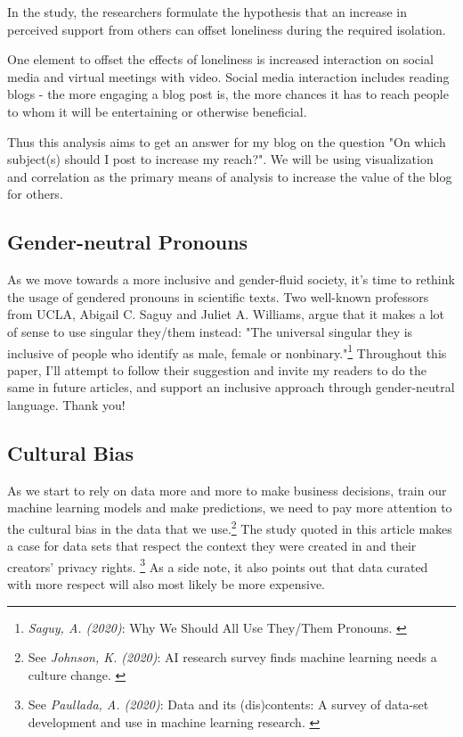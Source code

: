In the study, the researchers formulate the hypothesis that an increase in perceived support from others can offset loneliness during the required isolation.

One element to offset the effects of loneliness is increased interaction on social media and virtual meetings with video. Social media interaction includes reading blogs - the more engaging a blog post is, the more chances it has to reach people to whom it will be entertaining or otherwise beneficial.

Thus this analysis aims to get an answer for my blog on the question "On which subject(s) should I post to increase my reach?". We will be using visualization and correlation as the primary means of analysis to increase the value of the blog for others.

\subsection{Gender-neutral Pronouns}

As we move towards a more inclusive and gender-fluid society, it's time to rethink the usage of gendered pronouns in scientific texts. Two well-known professors from UCLA, Abigail C. Saguy and Juliet A. Williams, argue that it makes a lot of sense to use singular they/them instead: "The universal singular they is inclusive of people who identify as male, female or nonbinary."\footnote{\textit{Saguy, A. (2020)}: Why We Should All Use They/Them Pronouns. \cite{pronouns}} Throughout this paper, I'll attempt to follow their suggestion and invite my readers to do the same in future articles, and support an inclusive approach through gender-neutral language. Thank you!

\subsection{Cultural Bias}

As we start to rely on data more and more to make business decisions, train our machine learning models and make predictions, we need to pay more attention to the cultural bias in the data that we use.\footnote{See \textit{Johnson, K. (2020)}: AI research survey finds machine learning needs a culture change. \cite{aiResearch}} The study quoted in this article makes a case for data sets that respect the context they were created in and their creators' privacy rights. \footnote{See \textit{Paullada, A. (2020)}: Data and its (dis)contents: A survey of data-set development and use in machine learning research. \cite{cornellStudy}} As a side note, it also points out that data curated with more respect will also most likely be more expensive.

